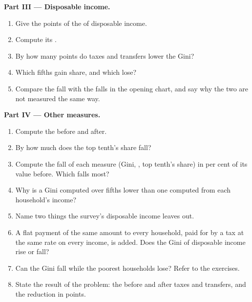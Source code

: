 \begin{problem}
\medskip
\noindent\textbf{Part III --- Disposable income.}
\begin{enumerate}[resume]
\item Give the points of the  of disposable income.
\item Compute its .
\item By how many points do taxes and transfers lower the Gini?
\item Which fifths gain share, and which lose?
\item Compare the fall with the falls in the opening chart, and say why the two are not measured the same way.
\end{enumerate}

\medskip
\noindent\textbf{Part IV --- Other measures.}
\begin{enumerate}[resume]
\item Compute the  before and after.
\item By how much does the top tenth's share fall?
\item Compute the fall of each measure (Gini, , top tenth's share) in per cent of its value before. Which falls most?
\item Why is a Gini computed over fifths lower than one computed from each household's income?
\item Name two things the survey's disposable income leaves out.
\item A flat payment of the same amount to every household, paid for by a tax at the same rate on every income, is added. Does the Gini of disposable income rise or fall?
\item Can the Gini fall while the poorest households lose? Refer to the exercises.
\item State the result of the problem: the  before and after taxes and transfers, and the reduction in points.
\end{enumerate}
\end{problem}
